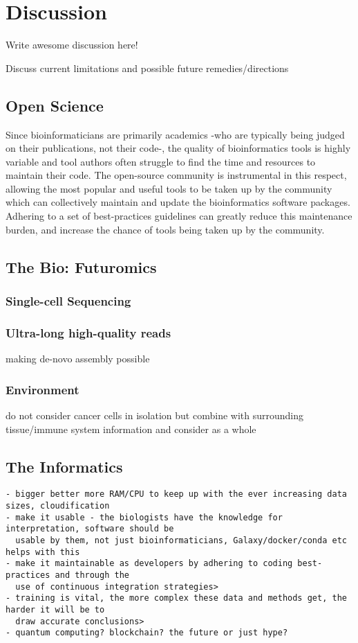 \chapter{Discussion}
\label{discussion}
\setcounter{figure}{-1}
\setcounter{table}{-1}
\setcounter{section}{-1}
\setcounter{NAT@ctr}{-1}

Write awesome discussion here!

Discuss current limitations and possible future remedies/directions

\section{Open Science}
Since bioinformaticians are primarily academics -who are typically being judged on their publications, not their code-, the quality of bioinformatics tools is highly variable and tool authors often struggle to find the time and resources to maintain their code. The open-source community is instrumental in this respect, allowing the most popular and useful tools to be taken up by the community which can collectively maintain and update the bioinformatics software packages. Adhering to a set of best-practices guidelines can greatly reduce this maintenance burden, and increase the chance of tools being taken up by the community.


\section{The Bio: Futuromics}

\subsection{Single-cell Sequencing}

\subsection{Ultra-long high-quality reads}
making de-novo assembly possible

\subsection{Environment}
do not consider cancer cells in isolation but combine with surrounding tissue/immune system information and consider as a whole


\section{The Informatics}
\begin{verbatim}
- bigger better more RAM/CPU to keep up with the ever increasing data sizes, cloudification
- make it usable - the biologists have the knowledge for interpretation, software should be
  usable by them, not just bioinformaticians, Galaxy/docker/conda etc helps with this
- make it maintainable as developers by adhering to coding best-practices and through the
  use of continuous integration strategies>
- training is vital, the more complex these data and methods get, the harder it will be to
  draw accurate conclusions>
- quantum computing? blockchain? the future or just hype?
\end{verbatim}

